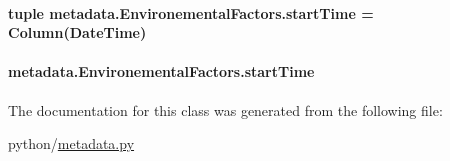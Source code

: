 \hypertarget{classmetadata_1_1EnvironementalFactors_afecc3211391a18b1750051da30ea0bfc}{
\paragraph[{start\-Time}]{\setlength{\rightskip}{0pt plus 5cm}tuple metadata.\-Environemental\-Factors.\-start\-Time = Column(Date\-Time)\hspace{0.3cm}{\ttfamily [static]}}}\label{classmetadata_1_1EnvironementalFactors_afecc3211391a18b1750051da30ea0bfc}
\hypertarget{classmetadata_1_1EnvironementalFactors_a06cee8a6fd4c3ef2d4e9efd6e3361693}{
\paragraph[{start\-Time}]{\setlength{\rightskip}{0pt plus 5cm}metadata.\-Environemental\-Factors.\-start\-Time}}\label{classmetadata_1_1EnvironementalFactors_a06cee8a6fd4c3ef2d4e9efd6e3361693}


The documentation for this class was generated from the following file\-:\begin{DoxyCompactItemize}
\item 
python/\hyperlink{metadata_8py}{metadata.\-py}\end{DoxyCompactItemize}
